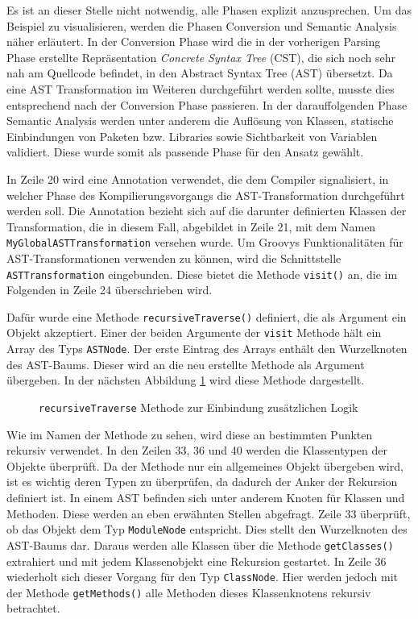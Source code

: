 Es ist an dieser Stelle nicht notwendig, alle Phasen explizit anzusprechen. 
Um das Beispiel zu visualisieren, werden die Phasen Conversion und Semantic Analysis näher erläutert. 
In der Conversion Phase wird die in der vorherigen Parsing Phase erstellte Repräsentation \textit{Concrete Syntax Tree} (CST), die sich noch sehr nah am Quellcode befindet, in den Abstract Syntax Tree (AST) übersetzt. 
Da eine AST Transformation im Weiteren durchgeführt werden sollte, musste dies entsprechend nach der Conversion Phase passieren. 
In der darauffolgenden Phase Semantic Analysis werden unter anderem die Auflösung von Klassen, statische Einbindungen von Paketen bzw. Libraries sowie Sichtbarkeit von Variablen validiert. 
Diese wurde somit als passende Phase für den Ansatz gewählt.

In Zeile 20 wird eine Annotation verwendet, die dem Compiler signalisiert, in welcher Phase des Kompilierungsvorgangs die AST-Transformation durchgeführt werden soll. Die Annotation bezieht sich auf die darunter definierten Klassen der Transformation, die in diesem Fall, abgebildet in Zeile 21, mit dem Namen \texttt{MyGlobalASTTransformation} versehen wurde. Um Groovys Funktionalitäten für AST-Transformationen verwenden zu können, wird die Schnittstelle \texttt{ASTTransformation} eingebunden. Diese bietet die Methode \texttt{visit()} an, die im Folgenden  in Zeile 24 überschrieben wird.

Dafür wurde eine Methode \texttt{recursiveTraverse()} definiert, die als Argument ein Objekt akzeptiert. Einer der beiden Argumente der \texttt{visit} Methode hält ein Array des Typs \texttt{ASTNode}. Der erste Eintrag des Arrays enthält den Wurzelknoten des AST-Baums. Dieser wird an die neu erstellte Methode als Argument übergeben. In der nächsten Abbildung \ref{fig:GlobalAst-recursiveTraverse} wird diese Methode dargestellt.


\begin{figure}[hbt!]
	
	\caption{\texttt{recursiveTraverse} Methode zur Einbindung zusätzlichen Logik}
	\label{fig:GlobalAst-recursiveTraverse}
\end{figure}


Wie im Namen der Methode zu sehen, wird diese an bestimmten Punkten rekursiv verwendet. In den Zeilen 33, 36 und 40 werden die Klassentypen der Objekte überprüft. Da der Methode nur ein allgemeines Objekt übergeben wird, ist es wichtig deren Typen zu überprüfen, da dadurch der Anker der Rekursion definiert ist. In einem AST befinden sich unter anderem Knoten für Klassen und Methoden. Diese werden an eben erwähnten Stellen abgefragt. Zeile 33 überprüft, ob das Objekt dem Typ \texttt{ModuleNode} entspricht. Dies stellt den Wurzelknoten des AST-Baums dar. Daraus werden alle Klassen über die Methode \texttt{getClasses()} extrahiert und mit jedem Klassenobjekt eine Rekursion gestartet.  In Zeile 36 wiederholt sich dieser Vorgang für den Typ \texttt{ClassNode}. Hier werden jedoch mit der Methode \texttt{getMethods()} alle Methoden dieses Klassenknotens rekursiv betrachtet.

